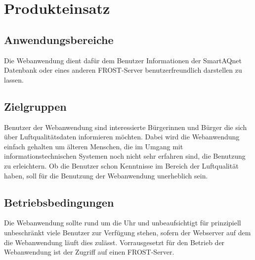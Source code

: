 \section{Produkteinsatz}

\subsection{Anwendungsbereiche}

Die \gls{Webanwendung} dient dafür dem Benutzer Informationen der \gls{SmartAQnet} Datenbank oder eines anderen \gls{FROST-Server} benutzerfreundlich darstellen zu lassen.

\subsection{Zielgruppen}

Benutzer der \gls{Webanwendung} sind interessierte Bürgerinnen und Bürger die sich über Luftqualitätsdaten informieren möchten. 
Dabei wird die \gls{Webanwendung} einfach gehalten um älteren Menschen, die im Umgang mit informationstechnischen Systemen noch nicht sehr erfahren sind, die Benutzung zu erleichtern.
Ob die Benutzer schon Kenntnisse im Bereich der Luftqualität haben, soll für die Benutzung der \gls{Webanwendung} unerheblich sein.

\subsection{Betriebsbedingungen}

Die \gls{Webanwendung} sollte rund um die Uhr und unbeaufsichtigt für prinzipiell unbeschränkt viele Benutzer zur Verfügung stehen, sofern der \gls{Webserver} auf dem die \gls{Webanwendung} läuft dies zulässt. 
Vorrausgesetzt für den Betrieb der \gls{Webanwendung} ist der Zugriff auf einen \gls{FROST-Server}.